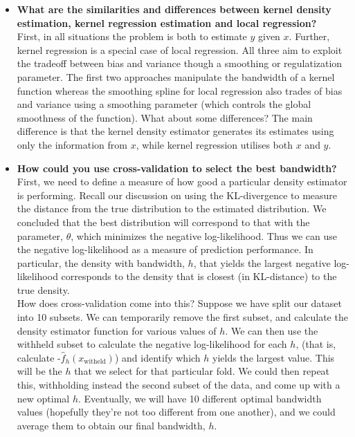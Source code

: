 \begin{itemize}
\item  \textbf{What are the similarities and differences between kernel density estimation, kernel regression estimation and local regression?}\\
First, in all situations the problem is both to estimate $y$ given $x$. Further, kernel regression is a special case of local regression. All three aim to exploit the tradeoff between bias and variance though a smoothing or regulatization parameter. The first two approaches manipulate the bandwidth of a kernel function whereas the smoothing spline for local regression also trades of bias and variance using a smoothing parameter (which controls the global smoothness of the function). What about some differences? The main difference is that the kernel density estimator generates its estimates using only the information from $x$, while kernel regression utilises both $x$ and $y$.
\item \textbf{How could you use cross-validation to select the best bandwidth?}\\
First, we need to define a measure of how good a particular density estimator is performing. Recall our discussion on using the KL-divergence to measure the distance from the true distribution to the estimated distribution. We concluded that the best distribution will correspond to that with the parameter, $\theta$, which minimizes the negative log-likelihood. Thus we can use the negative log-likelihood as a measure of prediction performance. In particular, the density with bandwidth, $h$, that yields the largest negative log-likelihood corresponds to the density that is closest (in KL-distance) to the true density.\\
How does cross-validation come into this? Suppose we have split our dataset into 10 subsets. We can temporarily remove the first subset, and calculate the density estimator function for various values of $h$. We can then use the withheld subset to calculate the negative log-likelihood for each $h$, (that is, calculate -$\hat{f}_h(x_{\text{witheld}})$) and identify which $h$ yields the largest value. This will be the $h$ that we select for that particular fold. We could then repeat this, withholding instead the second subset of the data, and come up with a new optimal $h$. Eventually, we will have 10 different optimal bandwidth values (hopefully they're not too different from one another), and we could average them to obtain our final bandwidth, $h$.
\end{itemize}

